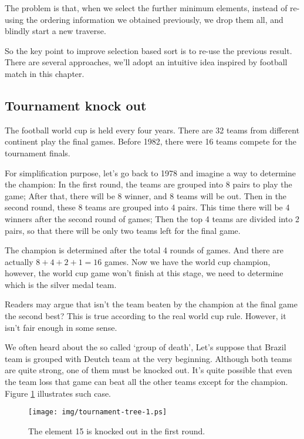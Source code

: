 \documentclass[UTF8]{article}
\begin{document}
The problem is that, when we select the further minimum elements, instead of re-using the ordering information
we obtained previously, we drop them all, and blindly start a new traverse.

So the key point to improve selection based sort is to re-use the previous result. There are several approaches,
we'll adopt an intuitive idea inspired by football match in this chapter.

\subsection{Tournament knock out}
The football world cup is held every four years. There are 32 teams from different continent
play the final games. Before 1982, there were 16 teams compete for the tournament finals\cite{wiki-wc}.

For simplification purpose, let's go back to 1978 and imagine a way to determine the champion:
In the first round, the teams
are grouped into 8 pairs to play the game; After that, there will be 8 winner, and 8 teams will
be out. Then in the second round, these 8 teams are grouped into 4 pairs. This time there
will be 4 winners after the second round of games; Then the top 4 teams are divided into
2 pairs, so that there will be only two teams left for the final game.

The champion is determined after the total 4 rounds of games. And there are actually $8+4+2+1 = 16$
games. Now we have the world cup champion, however, the world cup game won't finish at this stage,
we need to determine which is the silver medal team.

Readers may argue that isn't the team beaten by the champion at the final game the second best?
This is true according to the real world cup rule. However, it isn't fair enough in some sense.

We often heard about the so called `group of death', Let's suppose that Brazil team is
grouped with Deutch team at the very beginning. Although both teams are quite strong, one of
them must be knocked out. It's quite possible that even the team loss that game can beat
all the other teams except for the champion. Figure \ref{fig:tournament-tree-1} illustrates such
case.

\begin{figure}[htbp]
  \centering
  \texttt{[image: img/tournament-tree-1.ps]}
  \caption{The element 15 is knocked out in the first round.}
  \label{fig:tournament-tree-1}
\end{figure}
\end{document}
